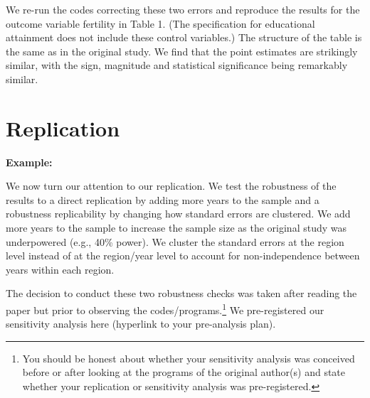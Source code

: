 \documentclass[12pt,a4paper]{article}
\begin{document}
We re-run the codes correcting these two errors and reproduce the results for the outcome variable fertility in Table 1. (The specification for educational attainment does not include these control variables.) The structure of the table is the same as in the original study. We find that the point estimates are strikingly similar, with the sign, magnitude and statistical significance being remarkably similar.

\section{Replication}




\textbf{Example:} 

We now turn our attention to our replication. We test the robustness of the results to a direct replication by adding more years to the sample and a robustness replicability by changing how standard errors are clustered. We add more years to the sample to increase the sample size as the original study was underpowered (e.g., 40\% power). We cluster the standard errors at the region level instead of at the region/year level to account for non-independence between years within each region.

The decision to conduct these two robustness checks was taken after reading the paper but prior to observing the codes/programs.\footnote{You should be honest about whether your sensitivity analysis was conceived before or after looking at the programs of the original author(s) and state whether your replication or sensitivity analysis was pre-registered.} We pre-registered our sensitivity analysis here (hyperlink to your pre-analysis plan).
\end{document}
